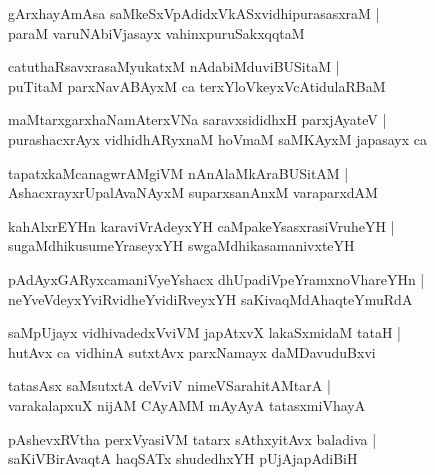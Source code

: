 \documentclass[twoside,12pt,openright]{book}
\newcounter{shloka}[chapter]
\begin{document}
\begin{shloka}%
gArxhayAmAsa saMkeSxVpAdidxVkASxvidhipurasasxraM |\\
paraM varuNAbiVjasayx vahinxpuruSakxqqtaM 
\end{shloka}

\begin{shloka}%
catuthaRsavxrasaMyukatxM nAdabiMduviBUSitaM |\\
puTitaM parxNavABAyxM ca terxYloVkeyxVcAtidulaRBaM 
\end{shloka}

\begin{shloka}%
maMtarxgarxhaNamAterxVNa saravxsididhxH parxjAyateV |\\
purashacxrAyx vidhidhARyxnaM hoVmaM saMKAyxM japasayx ca 
\end{shloka}

\begin{shloka}%
tapatxkaMcanagwrAMgiVM nAnAlaMkAraBUSitAM |\\
AshacxrayxrUpalAvaNAyxM suparxsanAnxM varaparxdAM 
\end{shloka}

\begin{shloka}%
kahAlxrEYHn karaviVrAdeyxYH caMpakeYsasxrasiVruheYH |\\
sugaMdhikusumeYraseyxYH swgaMdhikasamanivxteYH 
\end{shloka}

\begin{shloka}%
pAdAyxGARyxcamaniVyeYshacx dhUpadiVpeYramxnoVhareYHn |\\
neYveVdeyxYviRvidheYvidiRveyxYH saKivaqMdAhaqteYmuRdA 
\end{shloka}

\begin{shloka}%
saMpUjayx vidhivadedxVviVM japAtxvX lakaSxmidaM tataH |\\
hutAvx ca vidhinA sutxtAvx parxNamayx daMDavuduBxvi 
\end{shloka}

\begin{shloka}%
tatasAsx saMsutxtA deVviV nimeVSarahitAMtarA |\\
varakalapxuX nijAM CAyAMM mAyAyA tatasxmiVhayA 
\end{shloka}

\begin{shloka}%
pAshevxRVtha perxVyasiVM tatarx sAthxyitAvx baladiva |\\
saKiVBirAvaqtA haqSATx shudedhxYH pUjAjapAdiBiH 
\end{shloka}
\end{document}
